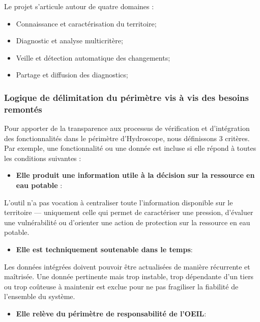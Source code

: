 \documentclass[
  french,
  11pt,
]{article}
\providecommand{\tightlist}{%
  \setlength{\itemsep}{0pt}\setlength{\parskip}{0pt}}
\begin{document}
Le projet s'articule autour de quatre domaines :

\begin{itemize}
\tightlist
\item
  Connaissance et caractérisation du territoire;
\item
  Diagnostic et analyse multicritère;
\item
  Veille et détection automatique des changements;
\item
  Partage et diffusion des diagnostics;
\end{itemize}

\subsubsection{Logique de délimitation du périmètre vis à vis des
besoins
remontés}\label{logique-de-duxe9limitation-du-puxe9rimuxe8tre-vis-uxe0-vis-des-besoins-remontuxe9s}

Pour apporter de la transparence aux processus de vérification et
d'intégration des fonctionnalités dans le périmètre d'Hydroscope, nous
définissons 3 critères. Par exemple, une fonctionnalité ou une donnée
est incluse si elle répond à toutes les conditions suivantes :

\begin{itemize}
\tightlist
\item
  \textbf{Elle produit une information utile à la décision sur la
  ressource en eau potable} :
\end{itemize}

L'outil n'a pas vocation à centraliser toute l'information disponible
sur le territoire --- uniquement celle qui permet de caractériser une
pression, d'évaluer une vulnérabilité ou d'orienter une action de
protection sur la ressource en eau potable.

\begin{itemize}
\tightlist
\item
  \textbf{Elle est techniquement soutenable dans le temps}:
\end{itemize}

Les données intégrées doivent pouvoir être actualisées de manière
récurrente et maîtrisée. Une donnée pertinente mais trop instable, trop
dépendante d'un tiers ou trop coûteuse à maintenir est exclue pour ne
pas fragiliser la fiabilité de l'ensemble du système.

\begin{itemize}
\tightlist
\item
  \textbf{Elle relève du périmètre de responsabilité de l'OEIL}:
\end{itemize}
\end{document}
